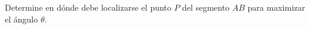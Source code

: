 \item Determine en dónde debe localizarse el punto $P$ del segmento $AB$ para maximizar el ángulo $\theta$.
